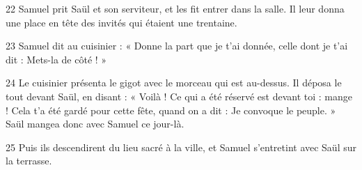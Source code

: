 
22 Samuel prit Saül et son serviteur, et les fit entrer dans la salle. Il leur donna une place en tête des invités qui étaient une trentaine.

23 Samuel dit au cuisinier : « Donne la part que je t’ai donnée, celle dont je t’ai dit : Mets-la de côté ! »

24 Le cuisinier présenta le gigot avec le morceau qui est au-dessus. Il déposa le tout devant Saül, en disant : « Voilà ! Ce qui a été réservé est devant toi : mange ! Cela t’a été gardé pour cette fête, quand on a dit : Je convoque le peuple. » Saül mangea donc avec Samuel ce jour-là.

25 Puis ils descendirent du lieu sacré à la ville, et Samuel s’entretint avec Saül sur la terrasse.
